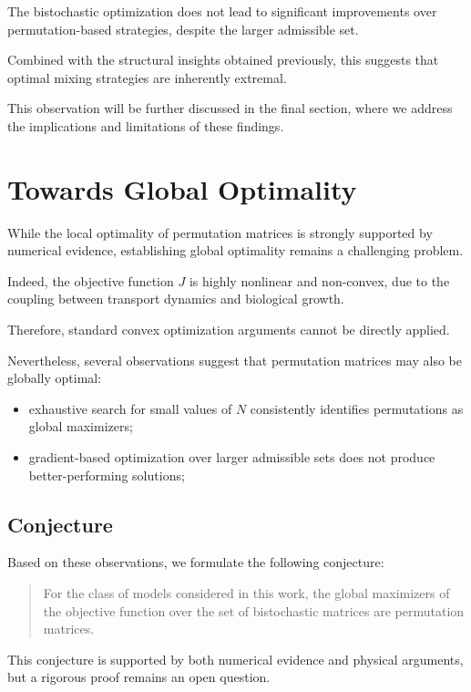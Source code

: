 \documentclass{article}
\begin{document}
The bistochastic optimization does not lead to significant improvements over 
permutation-based strategies, despite the larger admissible set.

Combined with the structural insights obtained previously, this suggests that 
optimal mixing strategies are inherently extremal.

This observation will be further discussed in the final section, where we address 
the implications and limitations of these findings.

\section{Towards Global Optimality}

While the local optimality of permutation matrices is strongly supported by numerical evidence, 
establishing global optimality remains a challenging problem.

Indeed, the objective function $J$ is highly nonlinear and non-convex, 
due to the coupling between transport dynamics and biological growth.

Therefore, standard convex optimization arguments cannot be directly applied.

Nevertheless, several observations suggest that permutation matrices may also be globally optimal:

\begin{itemize}
    \item exhaustive search for small values of $N$ consistently identifies permutations 
    as global maximizers;
    
    \item gradient-based optimization over larger admissible sets does not produce 
    better-performing solutions;
\end{itemize}

\subsection{Conjecture}

Based on these observations, we formulate the following conjecture:

\begin{quote}
For the class of models considered in this work, the global maximizers of the objective function 
over the set of bistochastic matrices are permutation matrices.
\end{quote}

This conjecture is supported by both numerical evidence and physical arguments, 
but a rigorous proof remains an open question.
\end{document}
